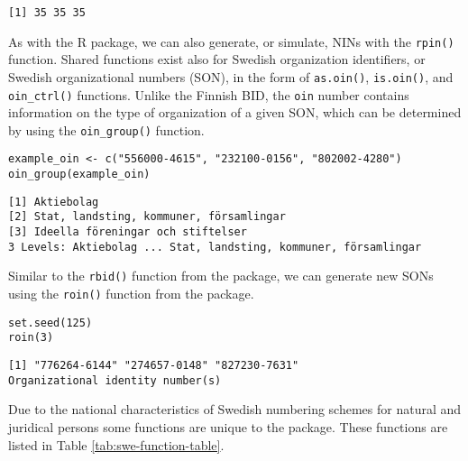 \begin{verbatim}
[1] 35 35 35
\end{verbatim}

As with the  R package, we can also generate, or simulate, NINs with the \texttt{rpin()} function. Shared functions exist also for Swedish organization identifiers, or Swedish organizational numbers (SON), in the form of \texttt{as.oin()}, \texttt{is.oin()}, and \texttt{oin\_ctrl()} functions. Unlike the Finnish BID, the \texttt{oin} number contains information on the type of organization of a given SON, which can be determined by using the \texttt{oin\_group()} function.

\begin{verbatim}
example_oin <- c("556000-4615", "232100-0156", "802002-4280")
oin_group(example_oin)
\end{verbatim}

\begin{verbatim}
[1] Aktiebolag                             
[2] Stat, landsting, kommuner, församlingar
[3] Ideella föreningar och stiftelser      
3 Levels: Aktiebolag ... Stat, landsting, kommuner, församlingar
\end{verbatim}

Similar to the \texttt{rbid()} function from the  package, we can generate new SONs using the \texttt{roin()} function from the  package.

\begin{verbatim}
set.seed(125)
roin(3)
\end{verbatim}

\begin{verbatim}
[1] "776264-6144" "274657-0148" "827230-7631"
Organizational identity number(s)
\end{verbatim}

Due to the national characteristics of Swedish numbering schemes for natural and juridical persons some functions are unique to the  package. These functions are listed in Table \ref{tab:swe-function-table}.

